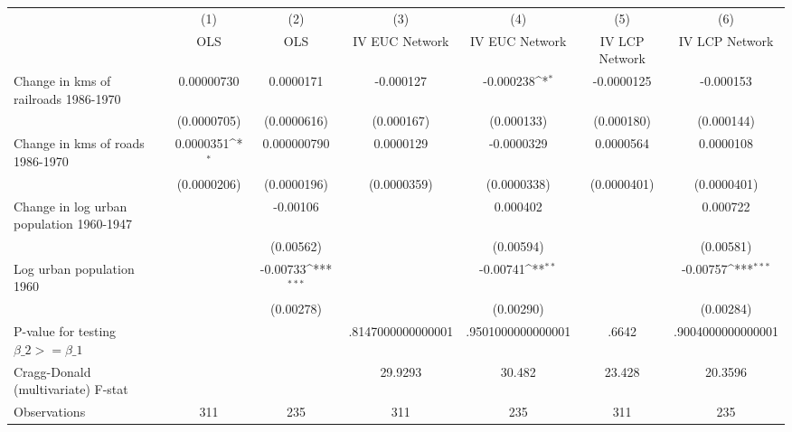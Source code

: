 {
\def\sym#1{\ifmmode^{#1}\else\(^{#1}\)\fi}
\begin{tabular}{l*{6}{c}}
\hline\hline
                &\multicolumn{1}{c}{(1)}&\multicolumn{1}{c}{(2)}&\multicolumn{1}{c}{(3)}&\multicolumn{1}{c}{(4)}&\multicolumn{1}{c}{(5)}&\multicolumn{1}{c}{(6)}\\
                &\multicolumn{1}{c}{OLS}&\multicolumn{1}{c}{OLS}&\multicolumn{1}{c}{IV EUC Network}&\multicolumn{1}{c}{IV EUC Network}&\multicolumn{1}{c}{IV LCP Network}&\multicolumn{1}{c}{IV LCP Network}\\
\hline
Change in kms of railroads 1986-1970&0.00000730         &0.0000171         &-0.000127         &-0.000238\sym{*}  &-0.0000125         &-0.000153         \\
                &(0.0000705)         &(0.0000616)         &(0.000167)         &(0.000133)         &(0.000180)         &(0.000144)         \\
[1em]
Change in kms of roads 1986-1970&0.0000351\sym{*}  &0.000000790         &0.0000129         &-0.0000329         &0.0000564         &0.0000108         \\
                &(0.0000206)         &(0.0000196)         &(0.0000359)         &(0.0000338)         &(0.0000401)         &(0.0000401)         \\
[1em]
Change in log urban population 1960-1947&                  & -0.00106         &                  & 0.000402         &                  & 0.000722         \\
                &                  &(0.00562)         &                  &(0.00594)         &                  &(0.00581)         \\
[1em]
Log urban population 1960&                  & -0.00733\sym{***}&                  & -0.00741\sym{**} &                  & -0.00757\sym{***}\\
                &                  &(0.00278)         &                  &(0.00290)         &                  &(0.00284)         \\
\hline
P-value for testing $\beta\_{2} >= \beta\_{1}$&                  &                  &.8147000000000001         &.9501000000000001         &    .6642         &.9004000000000001         \\
Cragg-Donald (multivariate) F-stat&                  &                  &  29.9293         &   30.482         &   23.428         &  20.3596         \\
Observations    &      311         &      235         &      311         &      235         &      311         &      235         \\
\hline\hline
\end{tabular}
}
